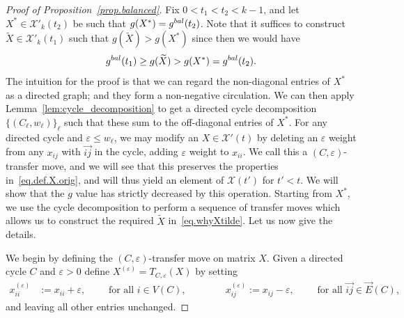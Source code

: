 \documentclass[10pt,a4paper]{amsart}
\newcommand{\cX}{\mathcal{X}}
\newcommand{\eps}{\varepsilon}
\begin{document}
\begin{proof}[Proof of Proposition~\ref{prop.balanced}]
Fix $0<t_1 < t_2 < k-1$, and let $X^*\in \cX'_k(t_2)$ be such that $g(X^*)=g^{\rm bal}(t_2)$. Note that it suffices to construct $\widetilde{X}\in \cX'_k(t_1)$ such that $g(\widetilde{X})>g(X^*)$ since then we would have
\begin{equation}\label{eq.whyXtilde} g^{\rm bal}(t_1) \geq g(\widetilde{X})>g(X^*) = g^{\rm bal}(t_2).\end{equation}
%
%
The intuition for the proof is that we can regard the non-diagonal entries of $X^*$ as a directed graph; and they form a non-negative circulation. We can then apply Lemma~\ref{lem:cycle_decomposition} to get a directed cycle decomposition $\{(C_\ell,w_\ell)\}_\ell$ such that these sum to the off-diagonal entries of $X^*$. For any directed cycle and $\eps \leq w_\ell$, we may modify an $X\in \cX'(t)$ by deleting an $\eps$ weight from any $x_{ij}$ with $\vec{ij}$ in the cycle, adding $\eps$ weight to $x_{ii}$. We call this a $(C, \eps)$-transfer move, and we will see that this preserves the properties in~\eqref{eq.def.X.orig}, and will thus yield an element of $\cX(t')$ for $t'<t$. We will show that the $g$ value has strictly decreased by this operation. Starting from $X^*$, we use the cycle decomposition to perform a sequence of transfer moves which allows us to construct the required $\widetilde{X}$ in~\eqref{eq.whyXtilde}. Let us now give the details.


We begin by defining the $(C,\eps)$-transfer move on matrix $X$. Given a directed cycle $C$ and $\eps>0$ define $X^{(\eps)}=T_{C,\eps}(X)$ by setting 
\begin{align*}
x^{(\varepsilon)}_{ii} &:= x_{ii}+\varepsilon, \qquad \text{ for all }i\in V(C),\qquad \qquad x^{(\varepsilon)}_{ij} := x_{ij}-\varepsilon, \qquad \text{ for all }\vec{ij}\in \vec{E}(C),
\end{align*}
and leaving all other entries unchanged.


\end{proof}
\end{document}
